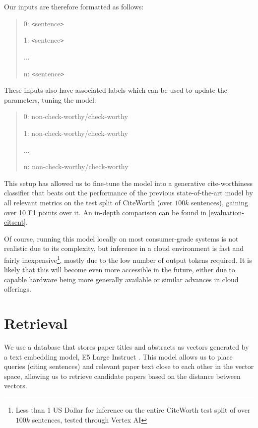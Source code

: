 \documentclass[12pt,a4paper]{report}
\begin{document}
Our inputs are therefore formatted as follows:

\begin{quote}
    0: \texttt{<}sentence\texttt{>}
    
    1: \texttt{<}sentence\texttt{>}
    
    ...
    
    n: \texttt{<}sentence\texttt{>}
\end{quote}

These inputs also have associated labels which can be used to update the parameters, tuning the model:

\begin{quote}
    0: non-check-worthy/check-worthy
    
    1: non-check-worthy/check-worthy
    
    ...
    
    n: non-check-worthy/check-worthy
\end{quote}

This setup has allowed us to fine-tune the model into a generative cite-worthiness classifier that beats out the performance of the previous state-of-the-art model by all relevant metrics on the test split of CiteWorth \cite{Wright2021CiteWorthCD} (over \(100k\) sentences), gaining over 10 F1 points over it. An in-depth comparison can be found in \autoref{evaluation-citsent}.

Of course, running this model locally on most consumer-grade systems is not realistic due to its complexity, but inference in a cloud environment is fast and fairly inexpensive\footnote{Less than 1 US Dollar for inference on the entire CiteWorth test split of over \(100k\) sentences, tested through Vertex AI}, mostly due to the low number of output tokens required. It is likely that this will become even more accessible in the future, either due to capable hardware being more generally available or similar advances in cloud offerings. 

\section{Retrieval}

We use a database that stores paper titles and abstracts as vectors generated by a text embedding model, E5 Large Instruct \cite{Wang2024MultilingualET}. This model allows us to place queries (citing sentences) and relevant paper text close to each other in the vector space, allowing us to retrieve candidate papers based on the distance between vectors.
\end{document}
